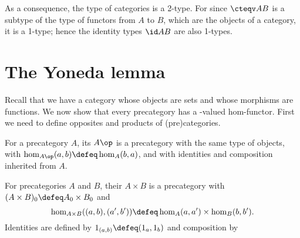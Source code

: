 As a consequence, the type of categories is a 2-type.
For since $\cteqv A B$ is a subtype of the type of functors from $A$ to $B$, which are the objects of a category, it is a 1-type; hence the identity types $\id A B$ are also 1-types.


\section{The Yoneda lemma}
\label{sec:yoneda}

Recall that we have a category \uset whose objects are sets and whose morphisms are functions.
We now show that every precategory has a \uset-valued hom-functor.
First we need to define opposites and products of (pre)categories.

\begin{defn}\label{ct:opposite-category}
  For a precategory $A$, its 
  $A\op$ is a precategory with the same type of objects, with $\hom_{A\op}(a,b) \defeq \hom_A(b,a)$, and with identities and composition inherited from $A$.
\end{defn}

\begin{defn}\label{ct:prod-cat}
  For precategories $A$ and $B$, their 
  $A\times B$ is a precategory with $(A\times B)_0 \defeq A_0 \times B_0$ and
  \[\hom_{A\times B}((a,b),(a',b')) \defeq \hom_A(a,a') \times \hom_B(b,b').\]
  Identities are defined by $1_{(a,b)}\defeq (1_a,1_b)$ and composition by
\end{defn}

